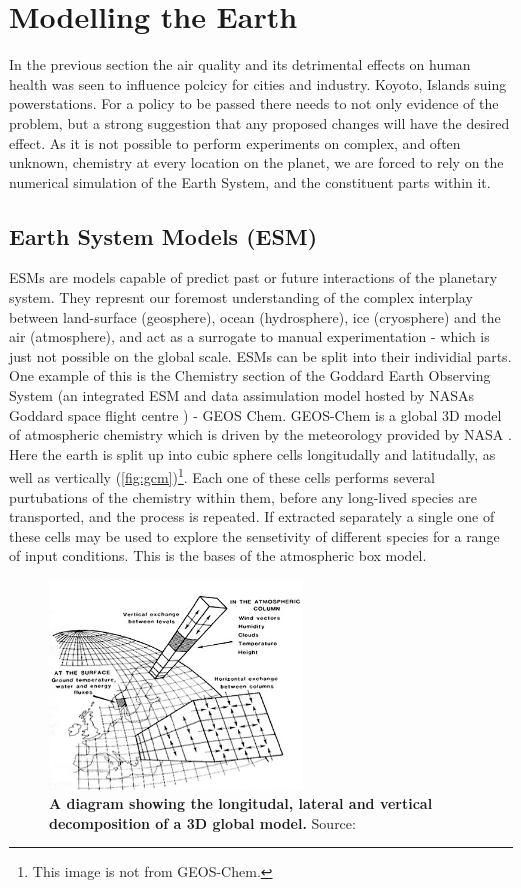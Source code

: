 
\section{Modelling the Earth}
In the previous section the air quality and its detrimental effects on human health was seen to influence polcicy for cities and industry. Koyoto, Islands suing powerstations.
For a policy to be passed there needs to not only evidence of the problem, but a strong suggestion that any proposed changes will have the desired effect. As it is not possible to perform experiments on complex, and often unknown, chemistry at every location on the planet, we are forced to rely on the numerical simulation of the Earth System, and the constituent parts within it.
\subsection{Earth System Models (ESM)}
  ESMs are models capable of predict past or future interactions of the planetary system. They represnt our foremost understanding of the complex interplay between land-surface (geosphere), ocean (hydrosphere), ice (cryosphere) and the air (atmosphere), and act as a surrogate to manual experimentation -  which is just not possible on the global scale.
ESMs can be split into their individial parts. One example of this is the Chemistry section of the Goddard Earth Observing System (an integrated ESM and data assimulation model hosted by NASAs Goddard space flight centre \citep{geoschem}) - GEOS Chem. GEOS-Chem is a global 3D model of atmospheric chemistry which is driven by the meteorology provided by NASA \citep{geos}. Here the earth is split up into cubic sphere cells longitudally and latitudally, as well as vertically (\autoref{fig:gcm})\footnote{This image is not from GEOS-Chem.}. Each one of these cells performs several purtubations of the chemistry within them, before any long-lived species are transported, and the process is repeated. If extracted separately a single one of these cells may be used to explore the sensetivity of different species for a range of input conditions. This is the bases of the atmospheric box model.
\begin{figure}
  \centering
  \includegraphics[width=0.6\textwidth]{gcm.jpg}
  \caption{\textbf{A diagram showing the longitudal, lateral and vertical decomposition of a 3D global model.} Source: \citep{gcm}}
  \label{fig:gcm}
\end{figure}
